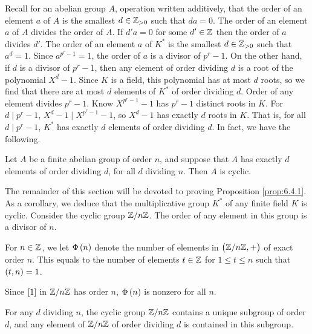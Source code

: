 Recall for an abelian group $ A $, operation written additively, that the order of an element $ a $ of $ A $ is the smallest $ d \in \mathbb{Z}_{> 0} $ such that $ da = 0 $. The order of an element $ a $ of $ A $ divides the order of $ A $. If $ d'a = 0 $ for some $ d' \in \mathbb{Z} $ then the order of $ a $ divides $ d' $. The order of an element $ a $ of $ K^* $ is the smallest $ d \in \mathbb{Z}_{> 0} $ such that $ a^d = 1 $. Since $ a^{p^r - 1} = 1 $, the order of $ a $ is a divisor of $ p^r - 1 $. On the other hand, if $ d $ is a divisor of $ p^r - 1 $, then any element of order dividing $ d $ is a root of the polynomial $ X^d - 1 $. Since $ K $ is a field, this polynomial has at most $ d $ roots, so we find that there are at most $ d $ elements of $ K^* $ of order dividing $ d $. Order of any element divides $ p^r - 1 $. Know $ X^{p^r - 1} - 1 $ has $ p^r - 1 $ distinct roots in $ K $. For $ d \mid p^r - 1 $, $ X^d - 1 \mid X^{p^r - 1} - 1 $, so $ X^d - 1 $ has exactly $ d $ roots in $ K $. That is, for all $ d \mid p^r - 1 $, $ K^* $ has exactly $ d $ elements of order dividing $ d $. In fact, we have the following.

\begin{proposition}
\label{prop:6.4.1}
Let $ A $ be a finite abelian group of order $ n $, and suppose that $ A $ has exactly $ d $ elements of order dividing $ d $, for all $ d $ dividing $ n $. Then $ A $ is cyclic.
\end{proposition}

The remainder of this section will be devoted to proving Proposition \ref{prop:6.4.1}. As a corollary, we deduce that the multiplicative group $ K^* $ of any finite field $ K $ is cyclic. Consider the cyclic group $ \mathbb{Z} / n\mathbb{Z} $. The order of any element in this group is a divisor of $ n $.

\begin{definition}
For $ n \in \mathbb{Z} $, we let $ \Phi\br{n} $ denote the number of elements in $ \br{\Z / n\Z, +} $ of exact order $ n $. This equals to the number of elements $ t \in \mathbb{Z} $ for $ 1 \le t \le n $ such that $ \br{t, n} = 1 $.
\end{definition}

\begin{note*}
Since $ \sbr{1} $ in $ \mathbb{Z} / n\mathbb{Z} $ has order $ n $, $ \Phi\br{n} $ is nonzero for all $ n $.
\end{note*}

\begin{lemma}
For any $ d $ dividing $ n $, the cyclic group $ \mathbb{Z} / n\mathbb{Z} $ contains a unique subgroup of order $ d $, and any element of $ \mathbb{Z} / n\mathbb{Z} $ of order dividing $ d $ is contained in this subgroup.
\end{lemma}

